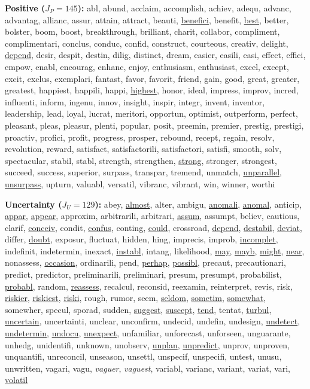 {\textbf{Positive ($J_{P} = 145$):} \textsf{abl, abund, acclaim, accomplish, achiev, adequ, advanc, advantag, allianc, assur, attain, attract, beauti, \underline{benefici}, benefit, \underline{best}, better, bolster, boom, boost, breakthrough, brilliant, charit, collabor, compliment, complimentari, conclus, conduc, confid, construct, courteous, creativ, delight, \underline{depend}, desir, despit, destin, dilig, distinct, dream, easier, easili, easi, effect, effici, empow, enabl, encourag, enhanc, enjoy, enthusiasm, enthusiast, excel, except, excit, exclus, exemplari, fantast, favor, favorit, friend, gain, good, great, greater, greatest, happiest, happili, happi, \underline{highest}, honor, ideal, impress, improv, incred, influenti, inform, ingenu, innov, insight, inspir, integr, invent, inventor, leadership, lead, loyal, lucrat, meritori, opportun, optimist, outperform, perfect, pleasant, pleas, pleasur, plenti, popular, posit, preemin, premier, prestig, prestigi, proactiv, profici, profit, progress, prosper, rebound, recept, regain, resolv, revolution, reward, satisfact, satisfactorili, satisfactori, satisfi, smooth, solv, spectacular, stabil, stabl, strength, strengthen, \underline{strong}, stronger, strongest, succeed, success, superior, surpass, transpar, tremend, unmatch, \underline{unparallel}, \underline{unsurpass}, upturn, valuabl, versatil, vibranc, vibrant, win, winner, worthi}

\textbf{Uncertainty ($J_{U} = 129$):} \textsf{abey, \underline{almost}, alter, ambigu, \underline{anomali}, \underline{anomal}, anticip, \underline{appar}, \underline{appear}, approxim, arbitrarili, arbitrari, \underline{assum}, assumpt, believ, cautious, clarif, \underline{conceiv}, condit, \underline{confus}, conting, \underline{could}, crossroad, \underline{depend}, \underline{destabil}, \underline{deviat}, differ, \underline{doubt}, exposur, fluctuat, hidden, hing, imprecis, improb, \underline{incomplet}, indefinit, indetermin, inexact, \underline{instabl}, intang, likelihood, \underline{may}, \underline{mayb}, \underline{might}, \underline{near}, nonassess, \underline{occasion}, ordinarili, pend, \underline{perhap}, \underline{possibl}, precaut, precautionari, predict, predictor, preliminarili, preliminari, presum, presumpt, probabilist, \underline{probabl}, random, \underline{reassess}, recalcul, reconsid, reexamin, reinterpret, revis, risk, \underline{riskier}, \underline{riskiest}, \underline{riski}, rough, rumor, seem, \underline{seldom}, \underline{sometim}, \underline{somewhat}, somewher, specul, sporad, sudden, \underline{suggest}, \underline{suscept}, \underline{tend}, tentat, \underline{turbul}, \underline{uncertain}, uncertainti, unclear, unconfirm, undecid, undefin, undesign, \underline{undetect}, \underline{undetermin}, \underline{undocu}, \underline{unexpect}, unfamiliar, unforecast, unforseen, unguarante, unhedg, unidentifi, unknown, unobserv, \underline{unplan}, \underline{unpredict}, unprov, unproven, unquantifi, unreconcil, unseason, unsettl, unspecif, unspecifi, untest, unusu, unwritten, vagari, vagu, \textit{vaguer}, \textit{vaguest}, variabl, varianc, variant, variat, vari, \underline{volatil}}

}
